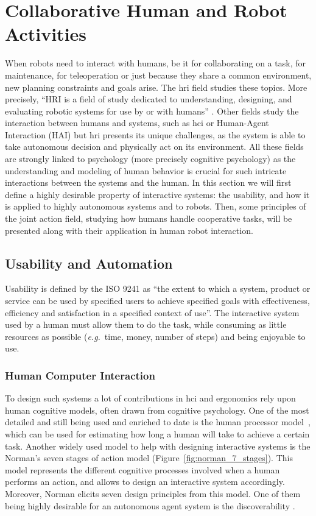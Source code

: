 \documentclass[a4paper,11pt,twoside]{StyleThese}
\begin{document}
\section{Collaborative Human and Robot Activities}
When robots need to interact with humans, be it for collaborating on a task, for maintenance, for teleoperation or just because they share a common environment, new planning constraints and goals arise. The \acrfull{hri} field studies these topics. More precisely, ``HRI is a field of study dedicated to understanding, designing, and evaluating robotic systems for use by or with humans'' \cite{goodrich_human-robot_2007}. Other fields study the interaction between humans and systems, such as \acrfull{hci} or Human-Agent Interaction (HAI) but \acrshort{hri} presents its unique challenges, as the system is able to take autonomous decision and physically act on its environment.
All these fields are strongly linked to psychology (more precisely cognitive psychology) as the understanding and modeling of human behavior is crucial for such intricate interactions between the systems and the human.
In this section we will first define a highly desirable property of interactive systems: the usability, and how it is applied to highly autonomous systems and to robots. Then, some principles of the joint action field, studying how humans handle cooperative tasks, will be presented along with their application in human robot interaction.

\subsection{Usability and Automation}
Usability is defined by the ISO 9241 as ``the extent to which a system, product or service can be used by specified users to achieve specified goals with effectiveness, efficiency and satisfaction in a specified context of use''. The interactive system used by a human must allow them to do the task, while consuming as little resources as possible (\textit{e.g.}~time, money, number of steps) and being enjoyable to use.

\subsubsection{Human Computer Interaction}

To design such systems a lot of contributions in \acrshort{hci} and ergonomics rely upon human cognitive models, often drawn from cognitive psychology. One of the most detailed and still being used and enriched to date is the human processor model~\cite{card1983psychology}, which can be used for estimating how long a human will take to achieve a certain task. Another widely used model to help with designing interactive systems is the Norman's seven stages of action model (Figure~\ref{fig:norman_7_stages}). This model represents the different cognitive processes involved when a human performs an action, and allows to design an interactive system accordingly. Moreover, Norman elicits seven design principles from this model. One of them being highly desirable for an autonomous agent system is the discoverability \cite{norman2013design}.
\end{document}
